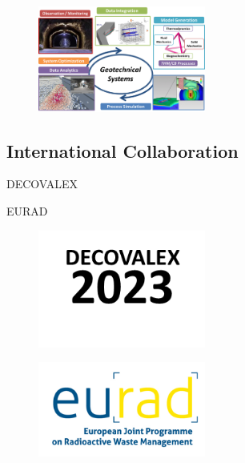 \begin{figure}
\vspace{-5mm}
\centering
\includegraphics[width=0.49\textwidth]{figures/workflow-geotechnics}
\caption{}
\label{fig:workflows}
\end{figure}
\lipsum[2]

\subsection*{International Collaboration}

\begin{list}{-}{\leftmargin=1em \itemindent=0em \itemsep=0em}
\item DECOVALEX
\item EURAD
\end{list}

\begin{figure}
\vspace{-5mm}
\centering
\includegraphics[width=0.49\textwidth]{figures/d2023}
\caption{}
\label{fig:workflows}
\end{figure}
\lipsum[2]

\begin{figure}
\vspace{-5mm}
\centering
\includegraphics[width=0.49\textwidth]{figures/eurad}
\caption{}
\label{fig:workflows}
\end{figure}
\lipsum[2]

